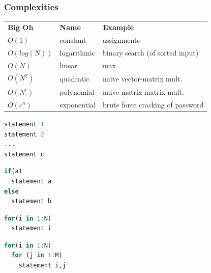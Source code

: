 \documentclass{beamer}
\begin{document}
\begin{frame}
	\frametitle{Complexities}
	\begin{table}[t]
		\begin{center}
			\begin{tabular}{ l l l }
				\textbf{Big Oh} & 
				\textbf{Name} & 
				\textbf{Example} \\
				$O(1)$ & constant & assignments \\
				$O(log(N))$ & logarithmic & binary search (of sorted input) \\
				$O(N)$ & linear & max \\
				$O(N^2)$ & quadratic & naive vector-matrix mult. \\
				$O(N^c)$ & polynomial & naive matrix-matrix mult. \\
				$O(c^n)$ & exponential & brute force cracking of password \\
			\end{tabular}
		\end{center}
	\end{table}
\end{frame}

\newsavebox{\listboxI}

\begin{lrbox}{\listboxI}
	\begin{lstlisting}[language=R,basicstyle=\ttfamily\small,keywordstyle=\color{black}]
statement 1
statement 2
...
statement c
	\end{lstlisting}
\end{lrbox}

\newsavebox{\listboxII}

\begin{lrbox}{\listboxII}	
\begin{lstlisting}[language=R,basicstyle=\ttfamily,keywordstyle=\color{black}]
if(a)
  statement a
else
  statement b
\end{lstlisting}
\end{lrbox}

\newsavebox{\listboxIII}

\begin{lrbox}{\listboxIII}	
\begin{lstlisting}[language=R,basicstyle=\ttfamily,keywordstyle=\color{black}]
for(i in 1:N)
  statement i
\end{lstlisting}
\end{lrbox}

\newsavebox{\listboxIV}

\begin{lrbox}{\listboxIV}	
	\begin{lstlisting}[language=R,basicstyle=\ttfamily,keywordstyle=\color{black}]
for(i in 1:N)
  for (j in 1:M)
    statement i,j
\end{lstlisting}
\end{lrbox}
\end{document}
